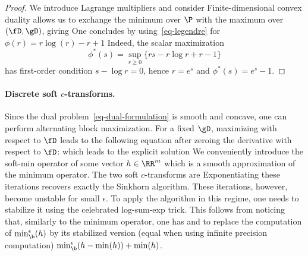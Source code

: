\begin{proof}
We introduce Lagrange multipliers and consider
	Finite-dimensional convex duality allows us to exchange the minimum over $\P$ with the maximum over $(\fD,\gD)$, giving
	One concludes by using~\eqref{eq-legendre} for $\phi(r)=r \log(r)-r+1$
	Indeed, the scalar maximization
	\[
		\phi^*(s)=\sup_{r\geq0}\{rs-r\log r+r-1\}
	\]
	has first-order condition $s-\log r=0$, hence $r=e^s$ and $\phi^*(s)=e^s-1$.
	\end{proof}

\paragraph{Discrete soft $c$-transforms.}

Since the dual problem~\eqref{eq-dual-formulation} is smooth and concave, one can perform alternating block maximization. For a fixed $\gD$, maximizing with respect to $\fD$ leads to the following equation after zeroing the derivative with respect to $\fD$:
which leads to the explicit solution
We conveniently introduce the soft-min operator of some vector $h \in \RR^m$
which is a smooth approximation of the minimum operator. The two soft $c$-transforms are
Exponentiating these iterations recovers exactly the Sinkhorn algorithm. These iterations, however, become unstable for small $\epsilon$. To apply the algorithm in this regime, one needs to stabilize it using the celebrated log-sum-exp trick. This follows from noticing that, similarly to the minimum operator, one has
and to replace the computation of ${\min}_{\b}^\epsilon(h)$ by its stabilized version (equal when using infinite precision computation) ${\min}_{\b}^\epsilon(h-\min(h)) + \min(h)$.

